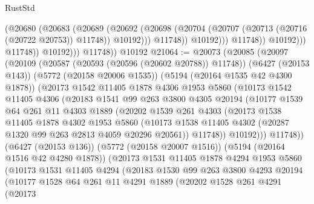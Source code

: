 \begin{lexlean}{RustStd}
\begin{coremodule}
{\begin{coremodule}
{{{{{{{{{{{{{{{{{{{{{{{{{{{{{                                (@20680
                                  (@20683
                                    (@20689
                                      (@20692
                                        (@20698
                                          (@20704
                                            (@20707 (@20713 (@20716 (@20722 @20753)) @11748))
                                            @10192)))
                                      @11748))
                                  @10192)))
                            @11748))
                        @10192)))
                  @11748))
              @10192)))
        @11748))
    @10192
@21064 := @20073
    (@20085
      (@20097
        (@20109
          (@20587 (@20593 (@20596 (@20602 @20788)) @11748))
          (@6427 (@20153 @143))
          (@5772 (@20158 @20006 @1535))
          (@5194 (@20164 @1535 @42 @4300 @1878))
          (@20173
            @1542
            @11405
            @1878
            @4306
            @1953
            @5860
            (@10173
              @1542
              @11405
              @4306
              (@20183
                @1541
                @99
                @263
                @3800
                @4305
                @20194
                (@10177
                  @1539
                  @64
                  @261
                  @11
                  @4303
                  @1889
                  (@20202
                    @1539
                    @261
                    @4303
                    (@20173
                      @1538
                      @11405
                      @1878
                      @4302
                      @1953
                      @5860
                      (@10173 @1538 @11405 @4302 (@20287 @1320 @99 @263 @2813 @4059 @20296 @20561))
                      @11748))
                  @10192)))
            @11748))
        (@6427 (@20153 @136))
        (@5772 (@20158 @20007 @1516))
        (@5194 (@20164 @1516 @42 @4280 @1878))
        (@20173
          @1531
          @11405
          @1878
          @4294
          @1953
          @5860
          (@10173
            @1531
            @11405
            @4294
            (@20183
              @1530
              @99
              @263
              @3800
              @4293
              @20194
              (@10177
                @1528
                @64
                @261
                @11
                @4291
                @1889
                (@20202
                  @1528
                  @261
                  @4291
                  (@20173
}}}}}}}}}}}}}}}}}}}}}}}}}}}}}
\end{coremodule}}
\end{coremodule}
\end{lexlean}
